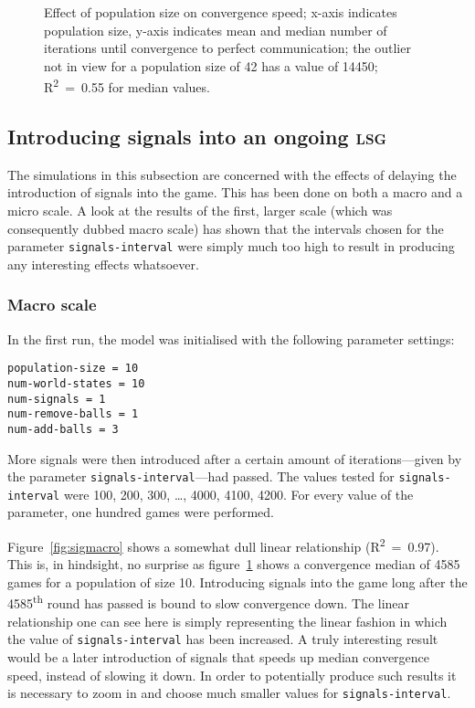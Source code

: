 \documentclass[
	DIV=calc,
	BCOR=0mm,
	pagesize,
	titlepage
]{scrartcl}
\newcommand{\code}[1]{\texttt{#1}}
\newcommand{\lsg}{\textsc{lsg}}
\newcommand{\dash}{—}
\begin{document}
\begin{figure}
	\centering
	\caption{Effect of population size on convergence speed; x-axis indicates population size, y-axis indicates mean and median number of iterations until convergence to perfect communication; the outlier not in view for a population size of 42 has a value of 14450; R\textsuperscript{2}~=~0.55 for median values.}
	\label{fig:pop}
\end{figure}

\subsection{Introducing signals into an ongoing \lsg}
\label{ssec:resint}
The simulations in this subsection are concerned with the effects of delaying the introduction of signals into the game.
This has been done on both a macro and a micro scale.
A look at the results of the first, larger scale (which was consequently dubbed macro scale) has shown that the intervals chosen for the parameter \code{signals-interval} were simply much too high to result in producing any interesting effects whatsoever.

\subsubsection*{Macro scale}
In the first run, the model was initialised with the following parameter settings:
\begin{verbatim}
population-size = 10
num-world-states = 10
num-signals = 1
num-remove-balls = 1
num-add-balls = 3
\end{verbatim}
More signals were then introduced after a certain amount of iterations\dash given by the parameter \code{signals-interval}\dash had passed.
The values tested for \code{signals-interval} were 100, 200, 300, \ldots, 4000, 4100, 4200.
For every value of the parameter, one hundred games were performed.

Figure~\ref{fig:sigmacro} shows a somewhat dull linear relationship (R\textsuperscript{2}~=~0.97).
This is, in hindsight, no surprise as figure~\ref{fig:pop} shows a convergence median of 4585 games for a population of size 10.
Introducing signals into the game long after the 4585\textsuperscript{th} round has passed is bound to slow convergence down.
The linear relationship one can see here is simply representing the linear fashion in which the value of \code{signals-interval} has been increased.
A truly interesting result would be a later introduction of signals that speeds up median convergence speed, instead of slowing it down.
In order to potentially produce such results it is necessary to zoom in and choose much smaller values for \code{signals-interval}.
\end{document}

